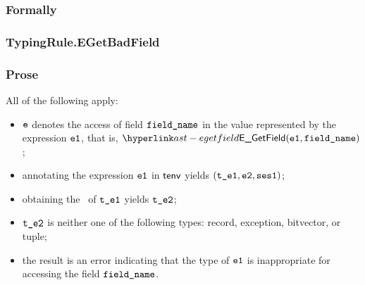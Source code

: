 \subsubsection{Formally}
\begin{mathpar}
\end{mathpar}

\subsubsection{TypingRule.EGetBadField\label{sec:TypingRule.EGetBadField}}
\subsubsection{Prose}
All of the following apply:
\begin{itemize}
  \item $\ve$ denotes the access of field $\fieldname$ in the value represented by the expression $\veone$, that is, $\EGetField(\veone, \fieldname)$;
  \item annotating the expression $\veone$ in $\tenv$ yields $(\vteone, \vetwo, \vsesone)$\ProseOrTypeError;
  \item obtaining the \underlyingtype\ of $\vteone$ yields $\vtetwo$\ProseOrTypeError;
  \item $\vtetwo$ is neither one of the following types: record, exception, bitvector, or tuple;
  \item the result is an error indicating that the type of $\veone$ is inappropriate for accessing the field $\fieldname$.
\end{itemize}
